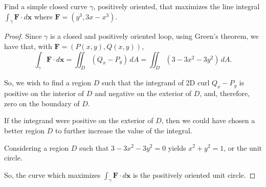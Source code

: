 \documentclass[../hw9]{subfiles}
\begin{document}
\begin{problem}[4]
Find a simple closed curve $\gamma$, positively oriented, that maximizes the line integral $\int_{\gamma}\textbf{F}\cdot d \textbf{x}$ where $\textbf{F} = (y^3, 3x-x^3)$.
\end{problem}
\begin{proof}
	Since $\gamma$ is a closed and positively oriented loop, using Green's theorem, we have that, with $\textbf{F} = (P(x,y),Q(x,y))$,
	\[
		\int_{\gamma}\textbf{F}\cdot d \textbf{x}
		= \iint_D (Q_x-P_y)\,dA
		= \iint_D (3-3x^2-3y^2)\,dA
		.\]

	So, we wish to find a region $D$ such that the integrand of 2D curl  $Q_x-P_y$ is positive on the interior of $D$ and negative on the exterior of  $D$,
	and, therefore, zero on the  boundary of $D$.

	If the integrand were positive on the exterior of $D$, then we could have chosen a better region $D$ to further increase the value of the integral.

	Considering a region  $D$ such that  $3-3x^2-3y^2=0$ yields $x^2 + y^2=1$, or the unit circle.

	So, the curve which maximizes  $\int_{\gamma} \textbf{F}\cdot d \textbf{x}$ is the positively oriented unit circle.
\end{proof}
\end{document}
